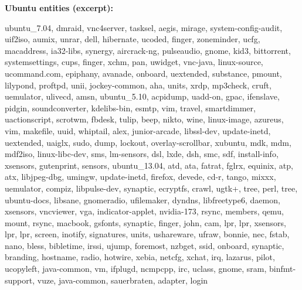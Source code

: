 \documentclass{article}
\begin{document}
\textbf{Ubuntu entities (excerpt):}
\begin{framed}
\scriptsize
ubuntu\_7.04, dmraid, vnc4server, tasksel, aegis, mirage, system-config-audit, uif2iso, aumix, unrar, dell, hibernate, ucoded, finger, zoneminder, ucfg, macaddress, ia32-libs, synergy, aircrack-ng, pulseaudio, gnome, kid3, bittorrent, systemsettings, cups, finger, xchm, pan, uwidget, vnc-java, linux-source, ucommand.com, epiphany, avanade, onboard, uextended, substance, pmount, lilypond, proftpd, unii, jockey-common, aha, units, xrdp, mp3check, cruft, uemulator, ulivecd, amsn, ubuntu\_5.10, acpidump, uadd-on, gpac, ifenslave, pidgin, soundconverter, kdelibs-bin, esmtp, vim, travel, smartdimmer, uactionscript, scrotwm, fbdesk, tulip, beep, nikto, wine, linux-image, azureus, vim, makefile, uuid, whiptail, alex, junior-arcade, libssl-dev, update-inetd, uextended, uaiglx, sudo, dump, lockout, overlay-scrollbar, xubuntu, mdk, mdm, mdf2iso, linux-libc-dev, sms, lm-sensors, dsl, lxde, dsh, smc, sdf, install-info, xsensors, gutenprint, sensors, ubuntu\_13.04, atd, ata, fatrat, fglrx, equinix, atp, atx, libjpeg-dbg, umingw, update-inetd, firefox, devede, cd-r, tango, mixxx, uemulator, compiz, libpulse-dev, synaptic, ecryptfs, crawl, ugtk+, tree, perl, tree, ubuntu-docs, libsane, gnomeradio, ufilemaker, dyndns, libfreetype6, daemon, xsensors, vncviewer, vga, indicator-applet, nvidia-173, rsync, members, qemu, mount, rsync, macbook, gsfonts, synaptic, finger, john, cam, lpr, lpr, xsensors, lpr, lpr, screen, inotify, signatures, units, ushareware, ufraw, bonnie, nec, fstab, nano, bless, bibletime, irssi, ujump, foremost, nzbget, ssid, onboard, synaptic, branding, hostname, radio, hotwire, xebia, netcfg, xchat, irq, lazarus, pilot, ucopyleft, java-common, vm, ifplugd, ncmpcpp, irc, uclass, gnome, sram, binfmt-support, vuze, java-common, sauerbraten, adapter, login
\end{framed}
\end{document}

